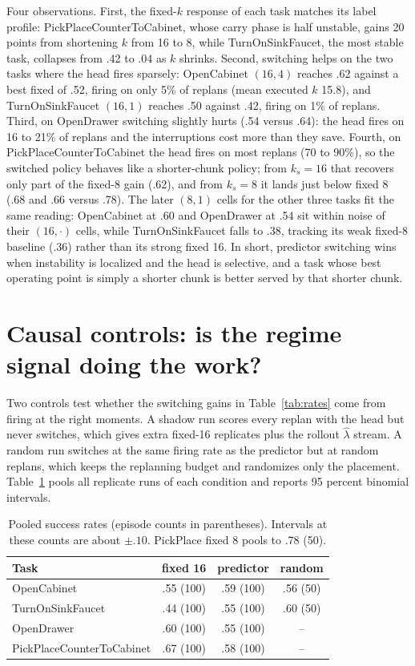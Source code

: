 \documentclass[11pt]{article}
\begin{document}
Four observations. First, the fixed-$k$ response of each task matches its
label profile: PickPlaceCounterToCabinet, whose carry phase is half unstable,
gains 20 points from shortening $k$ from 16 to 8, while TurnOnSinkFaucet,
the most stable task, collapses from .42 to .04 as $k$ shrinks. Second,
switching helps on the two tasks where the head fires sparsely:
OpenCabinet $(16,4)$ reaches .62 against a best fixed of .52, firing on only
5\% of replans (mean executed $k$ 15.8), and TurnOnSinkFaucet $(16,1)$ reaches
.50 against .42, firing on 1\% of replans. Third, on OpenDrawer switching
slightly hurts (.54 versus .64): the head fires on 16 to 21\% of replans and
the interruptions cost more than they save. Fourth, on
PickPlaceCounterToCabinet the head fires on most replans (70 to 90\%), so the
switched policy behaves like a shorter-chunk policy; from $k_s=16$ that
recovers only part of the fixed-8 gain (.62), and from $k_s=8$ it lands just
below fixed 8 (.68 and .66 versus .78). The later $(8,1)$ cells for the other three
tasks fit the same reading: OpenCabinet at .60 and OpenDrawer at .54 sit
within noise of their $(16,\cdot)$ cells, while TurnOnSinkFaucet falls to
.38, tracking its weak fixed-8 baseline (.36) rather than its strong fixed
16. In short, predictor switching wins
when instability is localized and the head is selective, and a task whose
best operating point is simply a shorter chunk is better served by that
shorter chunk.

\section{Causal controls: is the regime signal doing the work?}
\label{sec:controls}

Two controls test whether the switching gains in Table~\ref{tab:rates} come
from firing at the right moments. A shadow run scores every replan with the
head but never switches, which gives extra fixed-16 replicates plus the
rollout $\hat\lambda$ stream. A random run switches at the same firing rate
as the predictor but at random replans, which keeps the replanning budget and
randomizes only the placement. Table~\ref{tab:controls} pools all replicate
runs of each condition and reports 95 percent binomial intervals.

\begin{table}[h]
\centering
\small
\begin{tabular}{lccc}
\toprule
Task & fixed 16 & predictor & random \\
\midrule
OpenCabinet      & .55 (100) & .59 (100) & .56 (50) \\
TurnOnSinkFaucet & .44 (100) & .55 (100) & .60 (50) \\
OpenDrawer       & .60 (100) & .55 (100) & -- \\
PickPlaceCounterToCabinet & .67 (100) & .58 (100) & -- \\
\bottomrule
\end{tabular}
\caption{Pooled success rates (episode counts in parentheses). Intervals at
these counts are about $\pm .10$. PickPlace fixed 8 pools to .78 (50).}
\label{tab:controls}
\end{table}
\end{document}
